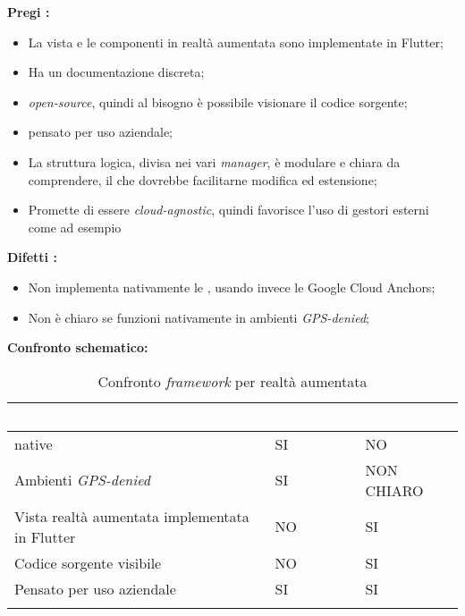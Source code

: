 \textbf{Pregi \aplug{}:}
\begin{itemize}
  \item La vista e le componenti in realtà aumentata sono implementate in Flutter;
  \item Ha un documentazione discreta;
  \item \e{} \textit{open-source}, quindi al bisogno è possibile visionare il codice sorgente;
  \item \e{} pensato per uso aziendale;
  \item La struttura logica, divisa nei vari \textit{manager}, è modulare e chiara da comprendere, il che dovrebbe facilitarne modifica ed estensione;
  \item Promette di essere \textit{cloud-agnostic}, quindi favorisce l'uso di gestori esterni come ad esempio \asa{} 
\end{itemize}

\textbf{Difetti \aplug{}:}
\begin{itemize}
  \item Non implementa nativamente le \asa{}, usando invece le Google Cloud Anchors;
  \item Non è chiaro se funzioni nativamente in ambienti \textit{GPS-denied};
\end{itemize}

\textbf{Confronto schematico:}

{
  \setlength{\freewidth}{\dimexpr\textwidth-10\tabcolsep}
  \renewcommand{\arraystretch}{1.5}
  \centering
  \setlength{\aboverulesep}{0pt}
  \setlength{\belowrulesep}{0pt}
  \begin{longtable}{C{.6\freewidth} C{.2\freewidth} C{.2\freewidth}} 
     \toprule 
  \textcolor{white}{\textbf{Caratteristica}} &
  \textcolor{white}{\textbf{ARwayKit}} &
  \textcolor{white}{\textbf{Plugin}}\\
  \midrule
  \endhead
  
  \asa{} native & SI & NO\\
  Ambienti \textit{GPS-denied} & SI & NON CHIARO\\
  Vista realtà aumentata implementata in Flutter & NO & SI\\
  Codice sorgente visibile & NO & SI\\
  Pensato per uso aziendale & SI & SI\\

  \bottomrule
  \caption{Confronto \textit{framework} per realtà aumentata}
  \end{longtable}
}

